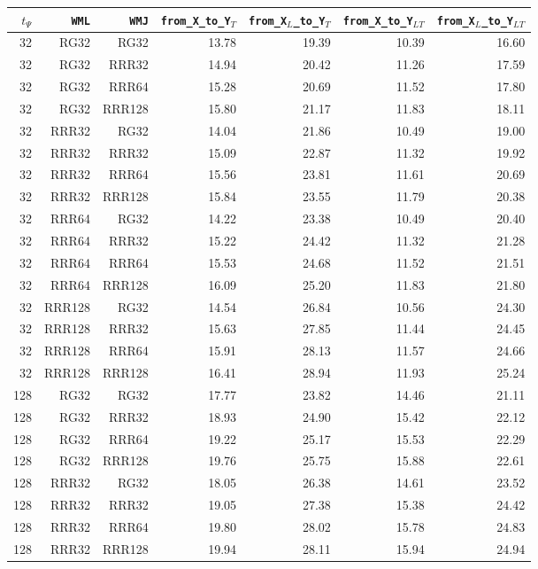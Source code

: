 \begin{table}
\begin{tabular}{|r|r|r|r|r|r|r|}
\hline
$t_{\Psi}$ & \texttt{WML} & \texttt{WMJ} & \texttt{from\_X\_to\_Y$_{T}$} & \texttt{from\_X$_{L}$\_to\_Y$_{T}$} & \texttt{from\_X\_to\_Y$_{LT}$} & \texttt{from\_X$_{L}$\_to\_Y$_{LT}$} \\
\hline
32 & RG32 & RG32 & 13.78 & 19.39 & 10.39 & 16.60 \\
32 & RG32 & RRR32 & 14.94 & 20.42 & 11.26 & 17.59 \\
32 & RG32 & RRR64 & 15.28 & 20.69 & 11.52 & 17.80 \\
32 & RG32 & RRR128 & 15.80 & 21.17 & 11.83 & 18.11 \\
32 & RRR32 & RG32 & 14.04 & 21.86 & 10.49 & 19.00 \\
32 & RRR32 & RRR32 & 15.09 & 22.87 & 11.32 & 19.92 \\
32 & RRR32 & RRR64 & 15.56 & 23.81 & 11.61 & 20.69 \\
32 & RRR32 & RRR128 & 15.84 & 23.55 & 11.79 & 20.38 \\
32 & RRR64 & RG32 & 14.22 & 23.38 & 10.49 & 20.40 \\
32 & RRR64 & RRR32 & 15.22 & 24.42 & 11.32 & 21.28 \\
32 & RRR64 & RRR64 & 15.53 & 24.68 & 11.52 & 21.51 \\
32 & RRR64 & RRR128 & 16.09 & 25.20 & 11.83 & 21.80 \\
32 & RRR128 & RG32 & 14.54 & 26.84 & 10.56 & 24.30 \\
32 & RRR128 & RRR32 & 15.63 & 27.85 & 11.44 & 24.45 \\
32 & RRR128 & RRR64 & 15.91 & 28.13 & 11.57 & 24.66 \\
32 & RRR128 & RRR128 & 16.41 & 28.94 & 11.93 & 25.24 \\
128 & RG32 & RG32 & 17.77 & 23.82 & 14.46 & 21.11 \\
128 & RG32 & RRR32 & 18.93 & 24.90 & 15.42 & 22.12 \\
128 & RG32 & RRR64 & 19.22 & 25.17 & 15.53 & 22.29 \\
128 & RG32 & RRR128 & 19.76 & 25.75 & 15.88 & 22.61 \\
128 & RRR32 & RG32 & 18.05 & 26.38 & 14.61 & 23.52 \\
128 & RRR32 & RRR32 & 19.05 & 27.38 & 15.38 & 24.42 \\
128 & RRR32 & RRR64 & 19.80 & 28.02 & 15.78 & 24.83 \\
128 & RRR32 & RRR128 & 19.94 & 28.11 & 15.94 & 24.94 \\

\end{tabular}
\end{table}
